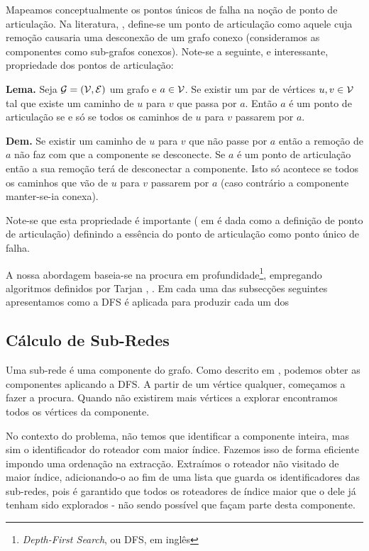 \documentclass[a4paper, 12pt, conference, portuguese]{ieeeconf}
\begin{document}
Mapeamos conceptualmente os pontos únicos de falha na noção de ponto de
articulação. Na literatura, \cite{cormen}, define-se um ponto de articulação como
aquele cuja remoção causaria uma desconexão de um grafo conexo (consideramos as
componentes como sub-grafos conexos). Note-se a seguinte, e interessante,
propriedade dos pontos de articulação:

\textbf{Lema.} Seja ${\cal G} = ({\cal V}, {\cal E})$ um grafo e $a \in {\cal
V}$. Se existir um par
de vértices $u, v \in {\cal V}$ tal que existe um caminho de $u$ para $v$ que passa por
$a$. Então $a$ é um ponto de
articulação se e só se todos os caminhos de $u$ para $v$ passarem por $a$.

\textbf{Dem.} Se existir um caminho de $u$ para $v$ que não passe por $a$ então
a remoção de $a$ não faz com que a componente se desconecte. Se $a$ é um ponto
de articulação então a sua remoção terá de desconectar a componente. Isto só
acontece se todos os caminhos que vão de $u$ para $v$ passarem por $a$ (caso
contrário a componente manter-se-ia conexa).

Note-se que esta propriedade é importante ( em \cite{tarjan1} é dada como a
definição de ponto de articulação) definindo a essência do ponto de
articulação como ponto único de falha.

A nossa abordagem baseia-se na procura em
profundidade\footnote{\textit{Depth-First Search}, ou DFS, em inglês}, empregando algoritmos
definidos por Tarjan \cite{tarjan1}, \cite{tarjan2}. Em cada uma das subsecções
seguintes apresentamos como a DFS é aplicada para produzir cada um dos

\subsection{Cálculo de Sub-Redes}
Uma sub-rede é uma componente do grafo. Como descrito em \cite{tarjan2}, podemos
obter as componentes aplicando a DFS. A partir de um vértice qualquer, começamos
a fazer a procura. Quando não existirem mais vértices a
explorar encontramos todos os vértices da componente.

No contexto do problema, não temos que
identificar a componente inteira, mas sim o identificador do roteador com maior
índice.  Fazemos isso de forma eficiente impondo uma ordenação na extracção.
Extraímos o roteador não visitado de maior índice, adicionando-o ao fim de uma
lista que guarda os identificadores das sub-redes, pois é garantido que todos os
roteadores de índice maior que o dele já tenham sido explorados - não sendo
possível que façam parte desta componente.
\end{document}
